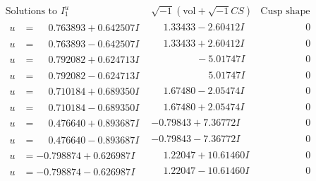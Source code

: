 \documentclass[1p]{elsarticle_modified}
\theoremstyle{definition}
\newcommand{\I}{\sqrt{-1}}
\begin{document}
$$\begin{array}{c|c|c}  
\text{Solutions to }I^u_{1}& \I (\text{vol} + \sqrt{-1}CS) & \text{Cusp shape}\\
 \hline 
\begin{aligned}
u &= \phantom{-}0.763893 + 0.642507 I\end{aligned}
 & \phantom{-}1.33433 - 2.60412 I & \phantom{-0.000000 } 0 \\ \hline\begin{aligned}
u &= \phantom{-}0.763893 - 0.642507 I\end{aligned}
 & \phantom{-}1.33433 + 2.60412 I & \phantom{-0.000000 } 0 \\ \hline\begin{aligned}
u &= \phantom{-}0.792082 + 0.624713 I\end{aligned}
 & \phantom{-0.000000 } -5.01747 I & \phantom{-0.000000 } 0 \\ \hline\begin{aligned}
u &= \phantom{-}0.792082 - 0.624713 I\end{aligned}
 & \phantom{-0.000000 -}5.01747 I & \phantom{-0.000000 } 0 \\ \hline\begin{aligned}
u &= \phantom{-}0.710184 + 0.689350 I\end{aligned}
 & \phantom{-}1.67480 - 2.05474 I & \phantom{-0.000000 } 0 \\ \hline\begin{aligned}
u &= \phantom{-}0.710184 - 0.689350 I\end{aligned}
 & \phantom{-}1.67480 + 2.05474 I & \phantom{-0.000000 } 0 \\ \hline\begin{aligned}
u &= \phantom{-}0.476640 + 0.893687 I\end{aligned}
 & -0.79843 + 7.36772 I & \phantom{-0.000000 } 0 \\ \hline\begin{aligned}
u &= \phantom{-}0.476640 - 0.893687 I\end{aligned}
 & -0.79843 - 7.36772 I & \phantom{-0.000000 } 0 \\ \hline\begin{aligned}
u &= -0.798874 + 0.626987 I\end{aligned}
 & \phantom{-}1.22047 + 10.61460 I & \phantom{-0.000000 } 0 \\ \hline\begin{aligned}
u &= -0.798874 - 0.626987 I\end{aligned}
 & \phantom{-}1.22047 - 10.61460 I & \phantom{-0.000000 } 0 \\ \hline\begin{aligned}

\end{aligned}
\end{array}$$
\end{document}
